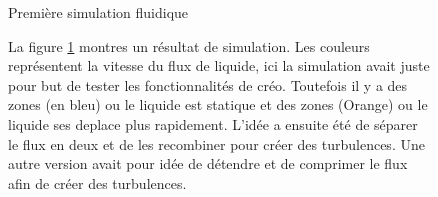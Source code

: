 \documentclass[a4paper, 11pt]{article}
\begin{document}
\newpage
\begin{multicols}{2}
    \begin{figure}[H]
        \centering
        \caption{Première simulation fluidique}
        \label{fig:simulation2}
    \end{figure}
    \begin{figure}[H]
        La figure \ref{fig:simulation2} montres un résultat de simulation.
        Les couleurs représentent la vitesse du flux de liquide, ici la simulation avait juste pour but de
        tester les fonctionnalités de créo. Toutefois il y a des zones (en bleu) ou le liquide est statique
        et des zones (Orange) ou le liquide ses deplace plus rapidement.
        L'idée a ensuite été de séparer le flux en deux et de les recombiner pour créer des turbulences.
        Une autre version avait pour idée de détendre et de comprimer le flux afin de créer des
        turbulences.
    \end{figure}
\end{multicols}
\end{document}
